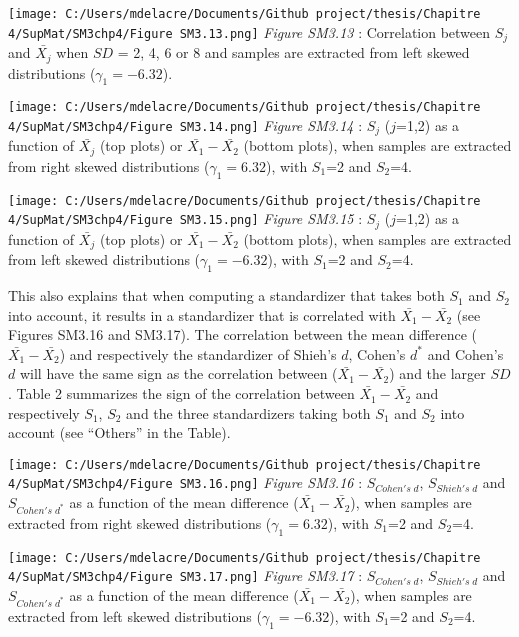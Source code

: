 \documentclass[
  english,
  man,mask,floatsintext]{apa6}
\begin{document}
\newpage

\texttt{[image: C:/Users/mdelacre/Documents/Github project/thesis/Chapitre 4/SupMat/SM3chp4/Figure SM3.13.png]}
\emph{Figure SM3.13} : Correlation between \(S_j\) and \(\bar{X_j}\) when \(SD\) = 2, 4, 6 or 8 and samples are extracted from left skewed distributions (\(\gamma_1 = -6.32\)).

\newpage

\texttt{[image: C:/Users/mdelacre/Documents/Github project/thesis/Chapitre 4/SupMat/SM3chp4/Figure SM3.14.png]}
\emph{Figure SM3.14} : \(S_j\) (\(j\)=1,2) as a function of \(\bar{X_j}\) (top plots) or \(\bar{X_1}-\bar{X_2}\) (bottom plots), when samples are extracted from right skewed distributions (\(\gamma_1 = 6.32\)), with \(S_1\)=2 and \(S_2\)=4.

\newpage

\texttt{[image: C:/Users/mdelacre/Documents/Github project/thesis/Chapitre 4/SupMat/SM3chp4/Figure SM3.15.png]}
\emph{Figure SM3.15} : \(S_j\) (\(j\)=1,2) as a function of \(\bar{X_j}\) (top plots) or \(\bar{X_1}-\bar{X_2}\) (bottom plots), when samples are extracted from left skewed distributions (\(\gamma_1 = -6.32\)), with \(S_1\)=2 and \(S_2\)=4.

\newpage

\setlength\parindent{24pt}This also explains that when computing a standardizer that takes both \(S_1\) and \(S_2\) into account, it results in a standardizer that is correlated with \(\bar{X_1}-\bar{X_2}\) (see Figures SM3.16 and SM3.17). The correlation between the mean difference (\(\bar{X_1}-\bar{X_2}\)) and respectively the standardizer of Shieh's \(d\), Cohen's \(d^*\) and Cohen's \(d\) will have the same sign as the correlation between (\(\bar{X_1}-\bar{X_2}\)) and the larger \(SD\). Table 2 summarizes the sign of the correlation between \(\bar{X_1}-\bar{X_2}\) and respectively \(S_1\), \(S_2\) and the three standardizers taking both \(S_1\) and \(S_2\) into account (see ``Others'' in the Table).

\texttt{[image: C:/Users/mdelacre/Documents/Github project/thesis/Chapitre 4/SupMat/SM3chp4/Figure SM3.16.png]}
\emph{Figure SM3.16} : \(S_{Cohen's \; d}\), \(S_{Shieh's \; d}\) and \(S_{Cohen's \; d^*}\) as a function of the mean difference (\(\bar{X_1}-\bar{X_2}\)), when samples are extracted from right skewed distributions (\(\gamma_1 = 6.32\)), with \(S_1\)=2 and \(S_2\)=4.

\newpage

\texttt{[image: C:/Users/mdelacre/Documents/Github project/thesis/Chapitre 4/SupMat/SM3chp4/Figure SM3.17.png]}
\emph{Figure SM3.17} : \(S_{Cohen's \; d}\), \(S_{Shieh's \; d}\) and \(S_{Cohen's \; d^*}\) as a function of the mean difference (\(\bar{X_1}-\bar{X_2}\)), when samples are extracted from left skewed distributions (\(\gamma_1 = -6.32\)), with \(S_1\)=2 and \(S_2\)=4.
\end{document}
